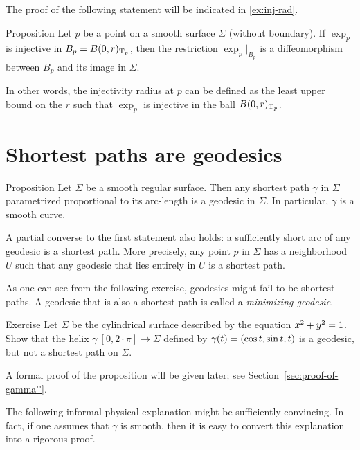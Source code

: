 The proof of the following statement will be indicated in \ref{ex:inj-rad}.

\begin{thm}{Proposition}\label{prop:inj-rad}
Let $p$ be a point on a smooth surface $\Sigma$ (without boundary).
If $\exp_p$ is injective in $B_p=B(0,r)_{\mathrm{T}_p}$, then the restriction $\exp_p|_{B_p}$ is a diffeomorphism between $B_p$ and its image in $\Sigma$.

In other words, the injectivity radius at $p$ can be defined as the least upper bound on the $r$ such that $\exp_p$ is injective in the ball $B(0,r)_{\mathrm{T}_p}$.
\end{thm}

\section{Shortest paths are geodesics}

\begin{thm}{Proposition}\label{prop:gamma''}
Let $\Sigma$ be a smooth regular surface.
Then any shortest path $\gamma$ in $\Sigma$ parametrized proportional to its arc-length is a geodesic in $\Sigma$.
In particular, $\gamma$ is a smooth curve.

A partial converse to the first statement also holds: a sufficiently short arc of any geodesic is a shortest path.
More precisely, any point $p$ in $\Sigma$ has a neighborhood $U$ such that any geodesic that lies entirely in $U$ is a shortest path.
\end{thm}

As one can see from the following exercise, geodesics might fail to be shortest paths.
A geodesic that is also a shortest path is called a \emph{minimizing geodesic}.

\begin{thm}{Exercise}\label{ex:helix=geodesic}
Let $\Sigma$ be the cylindrical surface described by the equation $x^2\z+y^2=1$.
Show that the helix $\gamma\:[0,2\cdot\pi]\to \Sigma$ defined by $\gamma(t)\z=(\cos t,\sin t, t)$
is a geodesic, but not a shortest path on $\Sigma$.
\end{thm}

A formal proof of the proposition will be given later; see Section~\ref{sec:proof-of-gamma''}.

The following informal physical explanation might be sufficiently convincing.
In fact, if one assumes that $\gamma$ is smooth, then it is easy to convert this explanation into a rigorous proof.

